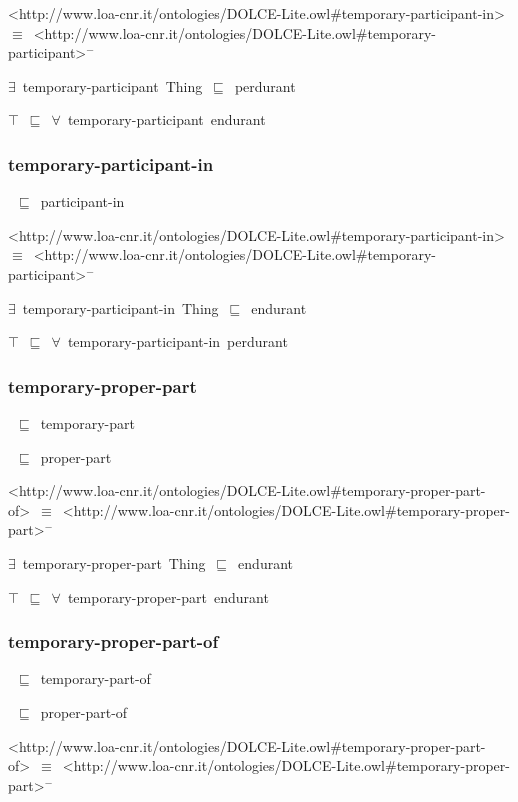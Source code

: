 \documentclass{article}
\begin{document}
<http://www.loa-cnr.it/ontologies/DOLCE-Lite.owl#temporary-participant-in>~\ensuremath{\equiv}~<http://www.loa-cnr.it/ontologies/DOLCE-Lite.owl#temporary-participant>\ensuremath{^-}

\ensuremath{\exists}~temporary-participant~Thing~\ensuremath{\sqsubseteq}~perdurant

\ensuremath{\top}~\ensuremath{\sqsubseteq}~\ensuremath{\forall}~temporary-participant~endurant

\subsubsection*{temporary-participant-in}

~\ensuremath{\sqsubseteq}~participant-in

<http://www.loa-cnr.it/ontologies/DOLCE-Lite.owl#temporary-participant-in>~\ensuremath{\equiv}~<http://www.loa-cnr.it/ontologies/DOLCE-Lite.owl#temporary-participant>\ensuremath{^-}

\ensuremath{\exists}~temporary-participant-in~Thing~\ensuremath{\sqsubseteq}~endurant

\ensuremath{\top}~\ensuremath{\sqsubseteq}~\ensuremath{\forall}~temporary-participant-in~perdurant

\subsubsection*{temporary-proper-part}

~\ensuremath{\sqsubseteq}~temporary-part

~\ensuremath{\sqsubseteq}~proper-part

<http://www.loa-cnr.it/ontologies/DOLCE-Lite.owl#temporary-proper-part-of>~\ensuremath{\equiv}~<http://www.loa-cnr.it/ontologies/DOLCE-Lite.owl#temporary-proper-part>\ensuremath{^-}

\ensuremath{\exists}~temporary-proper-part~Thing~\ensuremath{\sqsubseteq}~endurant

\ensuremath{\top}~\ensuremath{\sqsubseteq}~\ensuremath{\forall}~temporary-proper-part~endurant

\subsubsection*{temporary-proper-part-of}

~\ensuremath{\sqsubseteq}~temporary-part-of

~\ensuremath{\sqsubseteq}~proper-part-of

<http://www.loa-cnr.it/ontologies/DOLCE-Lite.owl#temporary-proper-part-of>~\ensuremath{\equiv}~<http://www.loa-cnr.it/ontologies/DOLCE-Lite.owl#temporary-proper-part>\ensuremath{^-}
\end{document}
